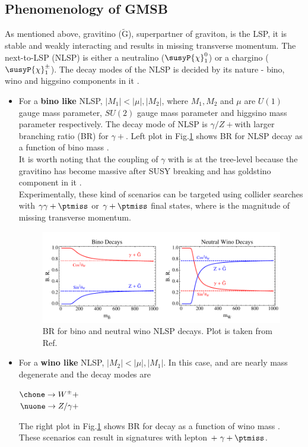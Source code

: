 \subsection{Phenomenology of GMSB}
As mentioned above, gravitino ($\tilde{\mathrm{G}}$), superpartner of graviton, is the LSP, it is stable and weakly interacting and results in missing transverse momentum. The next-to-LSP (NLSP) is either a neutralino ($\susyP{\chi}_{1}^{0}$) or a chargino ($\susyP{\chi}_{1}^{\pm}$). The decay modes of the NLSP is decided by its nature - bino, wino and higgsino components in it \cite{Knapen:2016exe}.
\begin{itemize}
\item For a \textbf{bino like} NLSP, $|M_1| < |\mu|, |M_2|$, where $M_1, M_2$ and $\mu$ are $U(1)$ gauge mass parameter, $SU(2)$ gauge mass parameter and higgsino mass parameter respectively. The decay mode of NLSP is $\gamma/Z +$\grav with larger branching ratio (BR) for  $\gamma +$\grav. Left plot in Fig.\ref{fig:NLSPwinoBinoBR} shows BR for NLSP decay as a function of bino mass \cite{Ruderman:2011vv}.\\
It is worth noting that the coupling of $\gamma$ with  is at the tree-level because the gravitino has become massive after SUSY breaking and has goldstino component in it \cite{Martin:1997ns}.\\
Experimentally, these kind of scenarios can be targeted using collider searches with $\gamma\gamma+\ptmiss$ or $\gamma+\ptmiss$ final states, where \ptmiss is the magnitude of missing transverse momentum.

\begin{figure}[h!]
\centering
\includegraphics[width=0.8\linewidth]{../Figures/Chap1/NLSPwinoBinoBR}
\caption[BR for bino and neutral wino NLSP decays]{BR for bino and neutral wino NLSP decays. Plot is taken from Ref.\cite{Ruderman:2011vv}}
\label{fig:NLSPwinoBinoBR}
\end{figure}

\item For a \textbf{wino like} NLSP, $|M_2| < |\mu|, |M_1|$. In this case, \nuone and \chone are nearly mass degenerate and the decay modes are
\begin{center}
$\chone \rightarrow W^\pm + $\grav \\%
$\nuone \rightarrow Z/\gamma + $\grav
\end{center}
The right plot in Fig.\ref{fig:NLSPwinoBinoBR} shows BR for \nuone decay as a function of wino mass \cite{Ruderman:2011vv}. These scenarios can result in signatures with lepton $+\ \gamma+\ptmiss$.


\end{itemize}
